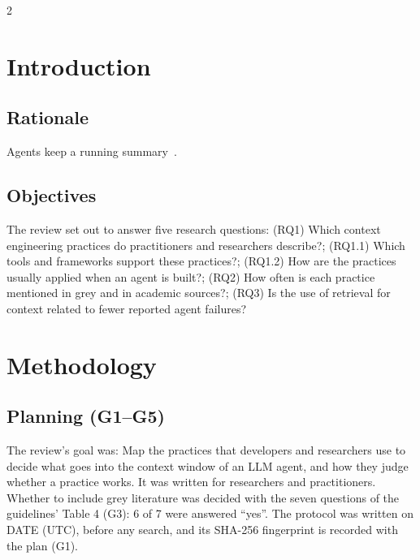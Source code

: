 \documentclass[10pt,a4paper]{article}
\begin{document}
\begin{multicols}{2}

\section{Introduction}\label{sec:introduction}

\subsection{Rationale}\label{sec:rationale}

Agents keep a running summary~\cite{ana2025managing}.

\subsection{Objectives}\label{sec:objectives}

The review set out to answer five research questions: (RQ1) Which context engineering practices do practitioners and researchers describe?; (RQ1.1) Which tools and frameworks support these practices?; (RQ1.2) How are the practices usually applied when an agent is built?; (RQ2) How often is each practice mentioned in grey and in academic sources?; (RQ3) Is the use of retrieval for context related to fewer reported agent failures?

\section{Methodology}\label{sec:methodology}

\subsection{Planning (G1–G5)}\label{sec:planning-g1-g5}

The review's goal was: Map the practices that developers and researchers use to decide what goes into the context window of an LLM agent, and how they judge whether a practice works.
It was written for researchers and practitioners.
Whether to include grey literature was decided with the seven questions of the guidelines' Table 4 (G3): 6 of 7 were answered ``yes''.
The protocol was written on DATE (UTC), before any search, and its SHA-256 fingerprint is recorded with the plan (G1).


\end{multicols}
\end{document}
